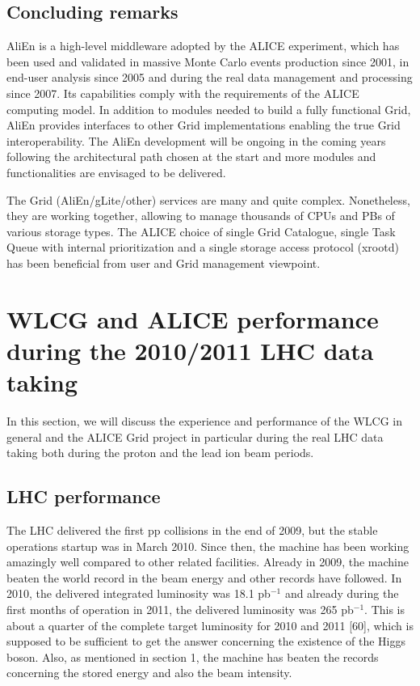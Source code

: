 \documentclass{intech}
\begin{document}
\subsection{Concluding remarks}
%
AliEn is a high-level middleware adopted by
the ALICE experiment, which has been used and validated in massive
Monte Carlo events production since 2001, in end-user analysis since
2005 and during the real data management and processing since 2007.
Its capabilities comply with the requirements of the ALICE computing
model. In addition to modules needed to build a fully functional
Grid, AliEn provides interfaces to other Grid implementations
enabling the true Grid interoperability. The AliEn development will
be ongoing in the coming years following the architectural path
chosen at the start and more modules and functionalities are
envisaged to be delivered.

The Grid (AliEn/gLite/other) services are many and quite complex.
Nonetheless, they are working together, allowing to manage thousands
of CPUs and PBs of various storage types. The ALICE choice of single
Grid Catalogue, single Task Queue with internal prioritization and a
single storage access protocol (xrootd) has been beneficial from
user and Grid management viewpoint.




\section{WLCG and ALICE performance during the 2010/2011 LHC data
taking}

In this section, we will discuss the experience and performance of
the WLCG in general and the ALICE Grid project in particular during
the real LHC data taking both during the proton and the lead ion
beam periods.

\subsection{LHC performance}
%
The LHC delivered the first pp collisions in the end of 2009, but
the stable operations startup was in March 2010. Since then, the
machine has been working amazingly well compared to other related
facilities. Already in 2009, the machine beaten the world record in
the beam energy and other records have followed. In 2010, the
delivered integrated luminosity was 18.1 pb${}^{-1}$ and already
during the first months of operation in 2011, the delivered
luminosity was 265 pb${}^{-1}$. This is about a quarter of the
complete target luminosity for 2010 and 2011 [60], which is supposed
to be sufficient to get the answer concerning the existence of the
Higgs boson. Also, as mentioned in section 1, the machine has beaten
the records concerning the stored energy and also the beam
intensity.
\end{document}
